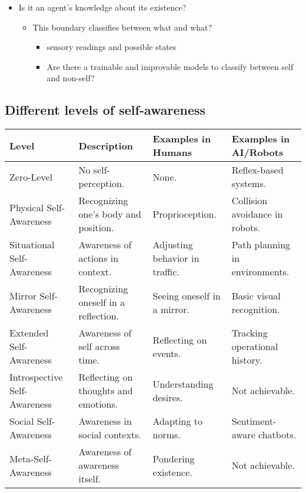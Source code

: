 \begin{itemize}
    \item Is it an agent's knowledge about its existence?

    \begin{itemize}
        \item This boundary classifies between what and what?
        \begin{itemize}
            \item sensory readings and possible states
            \item Are there a trainable and improvable models to classify between self and non-self?
        \end{itemize}
    \end{itemize}
\end{itemize}

\subsection{Different levels of self-awareness}
\begin{tabular}{|l|l|l|l|}
    \hline
    \textbf{Level}               & \textbf{Description}                 & \textbf{Examples in Humans}    & \textbf{Examples in AI/Robots} \\ \hline
    Zero-Level                   & No self-perception.                  & None.                          & Reflex-based systems.          \\ \hline
    Physical Self-Awareness      & Recognizing one’s body and position. & Proprioception.                & Collision avoidance in robots. \\ \hline
    Situational Self-Awareness   & Awareness of actions in context.     & Adjusting behavior in traffic. & Path planning in environments. \\ \hline
    Mirror Self-Awareness        & Recognizing oneself in a reflection. & Seeing oneself in a mirror. & Basic visual recognition. \\ \hline
    Extended Self-Awareness      & Awareness of self across time.       & Reflecting on events.          & Tracking operational history.  \\ \hline
    Introspective Self-Awareness & Reflecting on thoughts and emotions. & Understanding desires. & Not achievable. \\ \hline
    Social Self-Awareness        & Awareness in social contexts.        & Adapting to norms.             & Sentiment-aware chatbots.      \\ \hline
    Meta-Self-Awareness          & Awareness of awareness itself.       & Pondering existence.           & Not achievable.                \\ \hline
\end{tabular}

